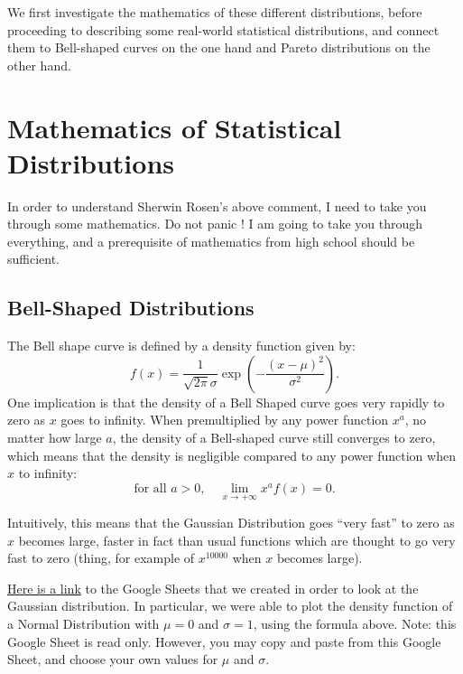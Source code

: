 \documentclass[]{book}
\theoremstyle{definition}
\theoremstyle{definition}
\theoremstyle{definition}
\theoremstyle{remark}
\begin{document}
We first investigate the mathematics of these different distributions,
before proceeding to describing some real-world statistical
distributions, and connect them to Bell-shaped curves on the one hand
and Pareto distributions on the other hand.

\section{Mathematics of Statistical Distributions}\label{mathematics}

In order to understand Sherwin Rosen's above comment, I need to take you
through some mathematics. Do not panic ! I am going to take you through
everything, and a prerequisite of mathematics from high school should be
sufficient.

\subsection{Bell-Shaped Distributions}\label{bell-shaped-distributions}

The Bell shape curve is defined by a density function given by:
\[f(x)=\frac{1}{\sqrt{2\pi}\sigma}\exp\left(-\frac{(x-\mu)^2}{\sigma^2}\right).\]
One implication is that the density of a Bell Shaped curve goes very
rapidly to zero as \(x\) goes to infinity. When premultiplied by any
power function \(x^a\), no matter how large \(a\), the density of a
Bell-shaped curve still converges to zero, which means that the density
is negligible compared to any power function when \(x\) to infinity:
\[\text{for all } a>0, \quad \lim_{x \to +\infty} x^a f(x) =0.\]

Intuitively, this means that the Gaussian Distribution goes ``very
fast'' to zero as \(x\) becomes large, faster in fact than usual
functions which are thought to go very fast to zero (thing, for example
of \(x^10000\) when \(x\) becomes large).

\href{https://docs.google.com/spreadsheets/d/1PJ9AjF0kDo-Fe5h3f4eAWZgccIjtn6urpA0Uk4OneXc/edit?usp=sharing}{Here
is a link} to the Google Sheets that we created in order to look at the
Gaussian distribution. In particular, we were able to plot the density
function of a Normal Distribution with \(\mu=0\) and \(\sigma=1\), using
the formula above. Note: this Google Sheet is read only. However, you
may copy and paste from this Google Sheet, and choose your own values
for \(\mu\) and \(\sigma\).
\end{document}
